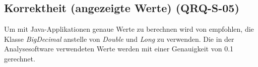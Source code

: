 \subsection{Korrektheit (angezeigte Werte) (QRQ-S-05)}
Um mit Java-Applikationen genaue Werte zu berechnen wird von \cite{bloch2008effective} empfohlen, die Klasse \textit{BigDecimal} anstelle von \textit{Double} und \textit{Long} zu verwenden. Die in der Analysesoftware verwendeten Werte werden mit einer Genauigkeit von 0.1 gerechnet.
